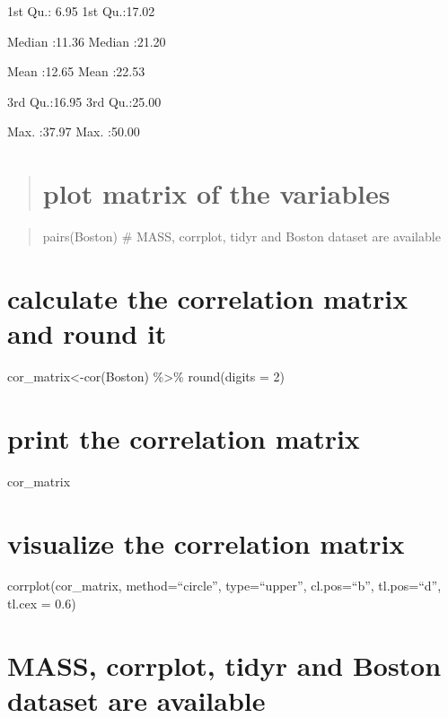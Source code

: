 \documentclass[]{article}
\begin{document}
1st Qu.: 6.95 1st Qu.:17.02

Median :11.36 Median :21.20

Mean :12.65 Mean :22.53

3rd Qu.:16.95 3rd Qu.:25.00

Max. :37.97 Max. :50.00

\begin{quote}
\end{quote}

\begin{quote}
\section{plot matrix of the
variables}\label{plot-matrix-of-the-variables}
\end{quote}

\begin{quote}
pairs(Boston) \# MASS, corrplot, tidyr and Boston dataset are available
\end{quote}

\section{calculate the correlation matrix and round
it}\label{calculate-the-correlation-matrix-and-round-it}

cor\_matrix\textless{}-cor(Boston) \%\textgreater{}\% round(digits = 2)

\section{print the correlation
matrix}\label{print-the-correlation-matrix}

cor\_matrix

\section{visualize the correlation
matrix}\label{visualize-the-correlation-matrix}

corrplot(cor\_matrix, method=``circle'', type=``upper'', cl.pos=``b'',
tl.pos=``d'', tl.cex = 0.6)

\section{MASS, corrplot, tidyr and Boston dataset are
available}\label{mass-corrplot-tidyr-and-boston-dataset-are-available}

\begin{quote}
\end{quote}
\end{document}
